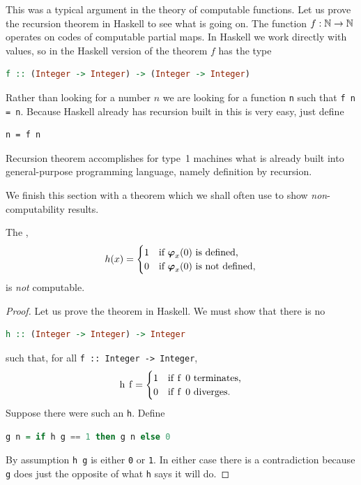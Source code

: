 This was a typical argument in the theory of computable functions. Let
us prove the recursion theorem in Haskell to see what is going on. The
function $f : \mathbb{N} \to \mathbb{N}$ operates on codes of computable partial
maps. In Haskell we work directly with values, so in the Haskell
version of the theorem $f$ has the type
%
\begin{lstlisting}[language=Haskell]
f :: (Integer -> Integer) -> (Integer -> Integer)
\end{lstlisting}
%
Rather than looking for a number $n$ we are looking for a function
\lstinline!n! such that \lstinline!f n = n!. Because Haskell already
has recursion built in this is very easy, just define
%
\begin{lstlisting}
n = f n
\end{lstlisting}
%
Recursion theorem accomplishes for type~1 machines what is already
built into general-purpose programming language, namely definition by
recursion.

We finish this section with a theorem which we shall often use to show
\emph{non}-computability results.

\begin{theorem}
  The ,
  \begin{equation*}
    h(x) =
    \begin{cases}
      1 & \text{if $\text{\boldmath{$\varphi$}}_{x}(0)$ is defined,}\\
      0 & \text{if $\text{\boldmath{$\varphi$}}_{x}(0)$ is not defined,}
    \end{cases}
  \end{equation*}
  is \emph{not} computable.
\end{theorem}

\begin{proof}
  Let us prove the theorem in Haskell. We must show that there is no
  \begin{lstlisting}[language=Haskell]
h :: (Integer -> Integer) -> Integer
  \end{lstlisting}
  such that, for all \lstinline!f :: Integer -> Integer!,
  \begin{equation*}
    \text{\lstinline!h f!} =
    \begin{cases}
      \text{\lstinline!1!} & \text{if \lstinline!f 0! terminates,}\\
      \text{\lstinline!0!} & \text{if \lstinline!f 0! diverges.}
    \end{cases}
  \end{equation*}
  Suppose there were such an \lstinline!h!. Define
  \begin{lstlisting}[language=Haskell]
g n = if h g == 1 then g n else 0
  \end{lstlisting}
  By assumption \lstinline!h g! is either \lstinline!0! or
  \lstinline!1!. In either case there is a contradiction because
  \lstinline!g! does just the opposite of what \lstinline!h! says it
  will do.
\end{proof}

